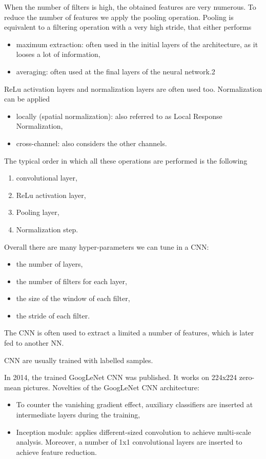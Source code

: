 \documentclass[oneside,onecolumn]{report}
\begin{document}
When the number of filters is high, the obtained features are very numerous.
To reduce the number of features we apply the pooling operation.
Pooling is equivalent to a filtering operation with a very high stride, that either performs
\begin{itemize}
    \item maximum extraction: often used in the initial layers of the architecture, as it looses a lot of information,
    \item averaging: often used at the final layers of the neural network.2
\end{itemize}

ReLu activation layers and normalization layers are often used too.
Normalization can be applied
\begin{itemize}
    \item locally (spatial normalization): also referred to as Local Response Normalization,
    \item cross-channel: also considers the other channels.
\end{itemize}

The typical order in which all these operations are performed is the following
\begin{enumerate}
    \item convolutional layer,
    \item ReLu activation layer,
    \item Pooling layer,
    \item Normalization step.
\end{enumerate}

Overall there are many hyper-parameters we can tune in a CNN:
\begin{itemize}
    \item the number of layers,
    \item the number of filters for each layer,
    \item the size of the window of each filter,
    \item the stride of each filter.
\end{itemize}

The CNN is often used to extract a limited a number of features, which is later fed to another NN.

CNN are usually trained with labelled samples.

In 2014, the trained GoogLeNet CNN was published.
It works on 224x224 zero-mean pictures.
Novelties of the GoogLeNet CNN architecture:
\begin{itemize}
    \item To counter the vanishing gradient effect, auxiliary classifiers are inserted at intermediate layers during the training,
    \item Inception module: applies different-sized convolution to achieve multi-scale analysis. Moreover, a number of 1x1 convolutional layers are inserted to achieve feature reduction.
\end{itemize}
\end{document}
